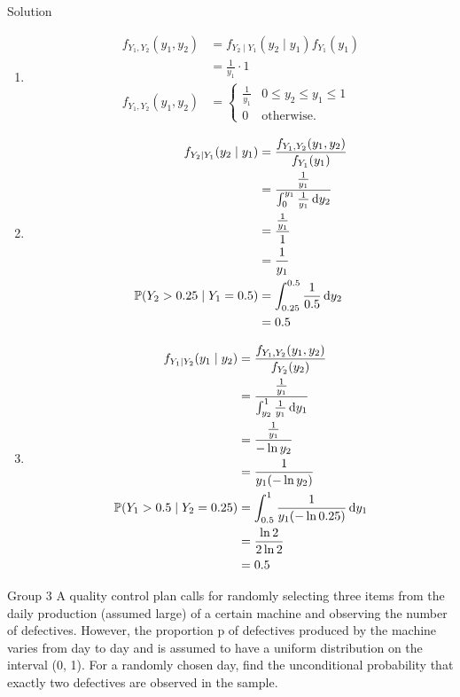 \documentclass{article}
\begin{document}
\begin{solution}
    {Solution}
    \begin{enumerate}
        \item
        \begin{align*}
            f_{Y_1,Y_2}(y_1,y_2)
            &= f_{Y_2\mid Y_1}(y_2\mid y_1)f_{Y_1}(y_1) \\
            &= \frac{1}{y_1}\cdot 1 \\
            f_{Y_1,Y_2}(y_1,y_2)
            &={
            \begin{cases}
                \frac{1}{y_1} & 0\leq y_2\leq y_1\leq 1\\
                0 & \text{otherwise.}
            \end{cases}
        }
        \end{align*}
        \item
        \begin{align*}
            f_{Y_2\mid Y_1}(y_2\mid y_1)
            &= \frac{f_{Y_1,Y_2}(y_1,y_2)}{f_{Y_1}(y_1)} \\
            &= \frac{\frac{1}{y_1}}{\int_{0}^{y_1}\frac{1}{y_1}\diff y_2} \\
            &= \frac{\frac{1}{y_1}}{1}\\
            &= \frac{1}{y_1} \\
            \condP{Y_2>0.25}{Y_1=0.5}
            &= \int_{0.25}^{0.5}\frac{1}{0.5}\diff y_2 \\
            &= 0.5
        \end{align*}
        \item
        \begin{align*}
            f_{Y_1\mid Y_2}(y_1\mid y_2)
            &= \frac{f_{Y_1,Y_2}(y_1,y_2)}{f_{Y_2}(y_2)} \\
            &= \frac{\frac{1}{y_1}}{\int_{y_2}^{1}\frac{1}{y_1}\diff y_1} \\
            &= \frac{\frac{1}{y_1}}{-\ln y_2} \\
            &= \frac{1}{y_1(-\ln y_2)} \\
            \P{Y_1>0.5\mid Y_2=0.25}
            &= \int_{0.5}^{1}\frac{1}{y_1(-\ln 0.25)}\diff y_1 \\
            &= \frac{\ln 2}{2\ln 2} \\
            &= 0.5
        \end{align*}
    \end{enumerate}
\end{solution}

\begin{problem}
    {Group 3}
    A quality control plan calls for randomly selecting three items from the daily production (assumed large) of a certain machine and observing the number of defectives. However, the proportion p of defectives produced by the machine varies from day to day and is assumed to have a uniform distribution on the interval (0, 1). For a randomly chosen day, find the unconditional probability that exactly two defectives are observed in the sample.
\end{problem}
\end{document}
